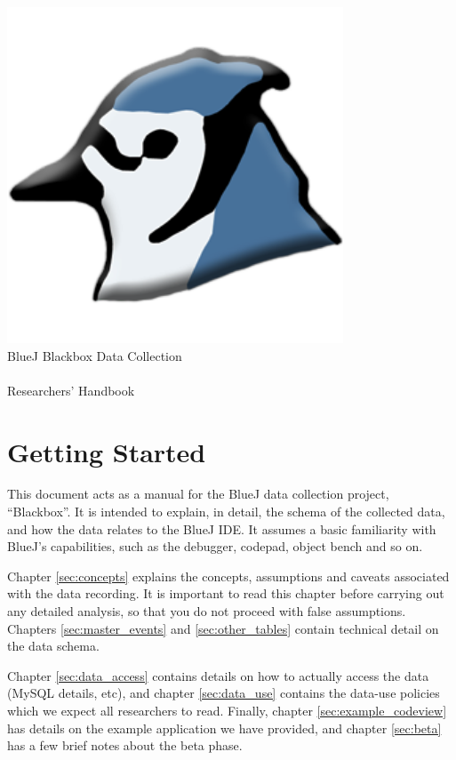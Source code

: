 \documentclass{report}
\begin{document}
\begin{titlepage}
  \begin{center}
    \includegraphics[width=10cm]{../../lib/images/bluej-icon-256.png}\\
    \huge BlueJ Blackbox Data Collection\\~\\Researchers' Handbook
  \end{center}
\end{titlepage}

\section*{Getting Started}

This document acts as a manual for the BlueJ data collection project,
``Blackbox''.  It is intended to explain, in detail, the schema of the
collected data, and how the data relates to the BlueJ IDE.  It assumes a basic
familiarity with BlueJ's capabilities, such as the debugger, codepad, object
bench and so on.

Chapter \ref{sec:concepts} explains the concepts, assumptions and caveats
associated with the data recording.  It is important to read this chapter
before carrying out any detailed analysis, so that you do not proceed with
false assumptions.  Chapters \ref{sec:master_events} and
\ref{sec:other_tables} contain technical detail on the data schema.

Chapter \ref{sec:data_access} contains details on how to actually access the
data (MySQL details, etc), and chapter \ref{sec:data_use} contains the
data-use policies which we expect all researchers to read.  Finally, chapter
\ref{sec:example_codeview} has details on the example application we have
provided, and chapter \ref{sec:beta} has a few brief notes about the beta phase.
\end{document}
